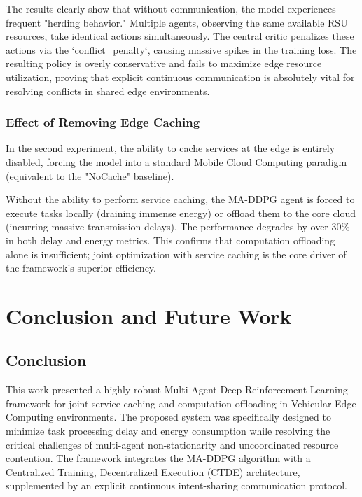\documentclass[12pt,a4paper]{report}
\begin{document}
The results clearly show that without communication, the model experiences frequent "herding behavior." Multiple agents, observing the same available RSU resources, take identical actions simultaneously. The central critic penalizes these actions via the `conflict\_penalty`, causing massive spikes in the training loss. The resulting policy is overly conservative and fails to maximize edge resource utilization, proving that explicit continuous communication is absolutely vital for resolving conflicts in shared edge environments.

\subsection{Effect of Removing Edge Caching}
In the second experiment, the ability to cache services at the edge is entirely disabled, forcing the model into a standard Mobile Cloud Computing paradigm (equivalent to the "NoCache" baseline). 

Without the ability to perform service caching, the MA-DDPG agent is forced to execute tasks locally (draining immense energy) or offload them to the core cloud (incurring massive transmission delays). The performance degrades by over 30\% in both delay and energy metrics. This confirms that computation offloading alone is insufficient; joint optimization with service caching is the core driver of the framework's superior efficiency.

\chapter{Conclusion and Future Work}

\section{Conclusion}

This work presented a highly robust Multi-Agent Deep Reinforcement Learning framework for joint service caching and computation offloading in Vehicular Edge Computing environments. The proposed system was specifically designed to minimize task processing delay and energy consumption while resolving the critical challenges of multi-agent non-stationarity and uncoordinated resource contention. The framework integrates the MA-DDPG algorithm with a Centralized Training, Decentralized Execution (CTDE) architecture, supplemented by an explicit continuous intent-sharing communication protocol.\\
\end{document}
